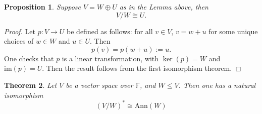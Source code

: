 \documentclass[12pt]{amsbook}
\newtheorem{theorem}{Theorem}[section]
\newtheorem{proposition}[theorem]{Proposition}
\begin{document}
\begin{proposition}
    Suppose $V = W \oplus U$ as in the Lemma above, then
    $$V/W \cong U.$$
\end{proposition}
\begin{proof}
    Let $p: V \to U$ be defined as follows: for all $v \in V$, $v = w + u$ for some unique choices of $w \in W$ and $u \in U$. Then
    $$p(v) = p(w+u) := u.$$
    One checks that $p$ is a linear transformation, with $\ker(p) = W$ and $\mathrm{im}(p) = U$. Then the result follows from the first isomorphism theorem.
\end{proof}

\begin{theorem}
    Let $V$ be a vector space over $\mathbb{F}$, and $W \leq V$. Then one has a natural isomorphism 
    $$(V/W)^* \cong \mathrm{Ann}(W)$$
\end{theorem}
\end{document}
